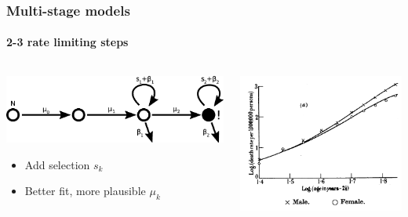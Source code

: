 \documentclass{beamer}
\begin{document}
\begin{frame}
    \frametitle{Multi-stage models}
    \framesubtitle{2-3 rate limiting steps\footnotemark[123]}
    \begin{columns}
        \begin{column}{0.5\textwidth}
        \begin{center}
        \includegraphics[width=1.00\textwidth]{figures/diagram3}
        \end{center}


        \begin{itemize}
            \item Add selection $s_k$
            \item Better fit, more plausible $\mu_k$
        \end{itemize}
        \end{column}
        \begin{column}{0.5\textwidth}
        \includegraphics[width=\textwidth]{figures/ArmitageDoll1957_4A.png}
        \end{column}
    \end{columns}

\end{frame}
\end{document}
